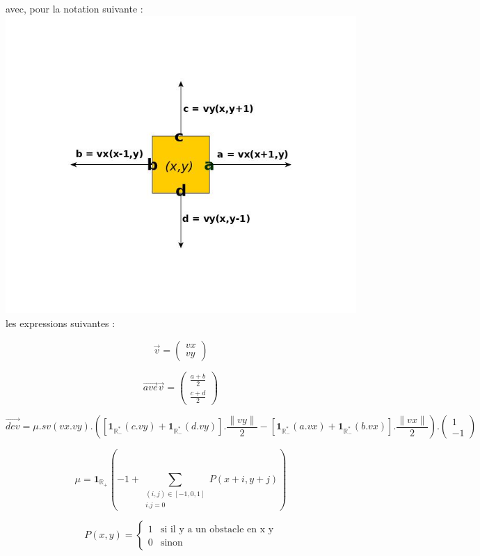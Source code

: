 \documentclass[10pt]{article}
\begin{document}
avec, pour la notation suivante :\\
\indent\indent\indent\indent\indent\indent\indent\includegraphics[scale=0.3]{notation.jpg}\\
les expressions suivantes :

\[ \overrightarrow{v} = 
\begin{pmatrix}
vx \\
vy
\end{pmatrix}
\]

\[\overrightarrow{ave}\overrightarrow{v} = 
\begin{pmatrix}
\frac{a+b}{2} \\
\frac{c+d}{2}
\end{pmatrix}
\]

\[\overrightarrow{dev} = \mu.sv(vx.vy).([\mathbf{1}_{\mathbb{R_-^*}}(c.vy)+\mathbf{1}_{\mathbb{R_-^*}}(d.vy)].\frac{\|vy\|}{2}-[\mathbf{1}_{\mathbb{R_-^*}}(a.vx)+\mathbf{1}_{\mathbb{R_-^*}}(b.vx)].\frac{\|vx\|}{2}).
\begin{pmatrix}
1 \\
-1
\end{pmatrix}
\]

\[\mu = \mathbf{1}_{\mathbb{R_+}}(-1+\sum_{\substack{(i,j)\in[-1,0,1]\\i.j=0}}{P(x+i,y+j)})\]

\[ P(x,y) = 
\begin{cases}
	1 & \text{si il y a un obstacle en x y} \\
	0 & \text{sinon}
\end{cases}
\]
\end{document}
